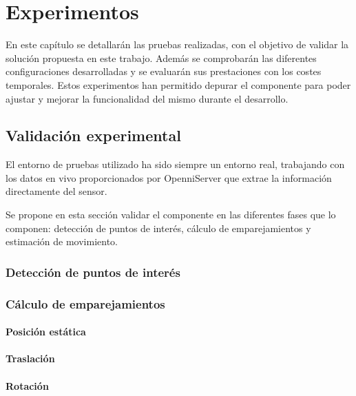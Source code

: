 
\chapter{Experimentos}

\label{Chapter5} %

En este capítulo se detallarán las pruebas realizadas, con el objetivo de validar la solución propuesta en este trabajo. Además se comprobarán las diferentes configuraciones desarrolladas y se evaluarán sus prestaciones con los costes temporales. Estos experimentos han permitido depurar el componente para poder ajustar y mejorar la funcionalidad del mismo durante el desarrollo.

\section{Validación experimental}

El entorno de pruebas utilizado ha sido siempre un entorno real, trabajando con los datos en vivo proporcionados por OpenniServer que extrae la información directamente del sensor.

Se propone en esta sección validar el componente en las diferentes fases que lo componen: detección de puntos de interés, cálculo de emparejamientos y estimación de movimiento.

\subsection{Detección de puntos de interés}



\subsection{Cálculo de emparejamientos}


\subsubsection{Posición estática}
\subsubsection{Traslación}
\subsubsection{Rotación}


